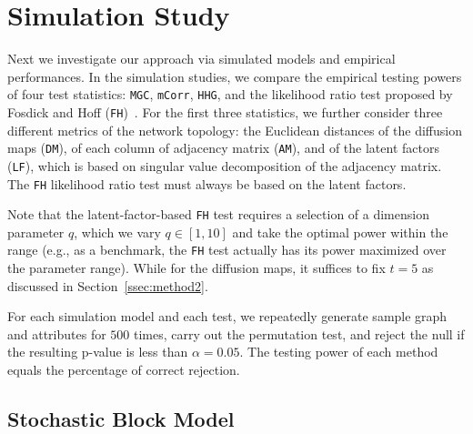 \documentclass[11pt]{article}
\theoremstyle{definition}
\begin{document}
\section{Simulation Study}
\label{sec:simulation}
	\vspace*{-0.2cm}
Next we investigate our approach via simulated models and empirical performances. In the simulation studies, we compare the empirical testing powers of four test statistics: \texttt{MGC}, \texttt{mCorr}, \texttt{HHG}, and the likelihood ratio test proposed by Fosdick and Hoff (\texttt{FH})~\cite{fosdick2015testing}. For the first three statistics, we further consider three different metrics of the network topology: the Euclidean distances of the diffusion maps (\texttt{DM}), of each column of adjacency matrix (\texttt{AM}), and of the latent factors (\texttt{LF}), which is based on singular value decomposition of the adjacency matrix. The \texttt{FH} likelihood ratio test must always be based on the latent factors.

Note that the latent-factor-based \texttt{FH} test requires a selection of a dimension parameter $q$, which we vary $q \in [1,10]$ and take the optimal power within the range (e.g., as a benchmark, the \texttt{FH} test actually has its power maximized over the parameter range). While for the diffusion maps, it suffices to fix $t=5$ as discussed in Section~\ref{ssec:method2}.

For each simulation model and each test, we repeatedly generate sample graph and attributes for $500$ times, carry out the permutation test, and reject the null if the resulting p-value is less than $\alpha = 0.05$. The testing power of each method equals the percentage of correct rejection. 

\subsection{Stochastic Block Model}
\end{document}
